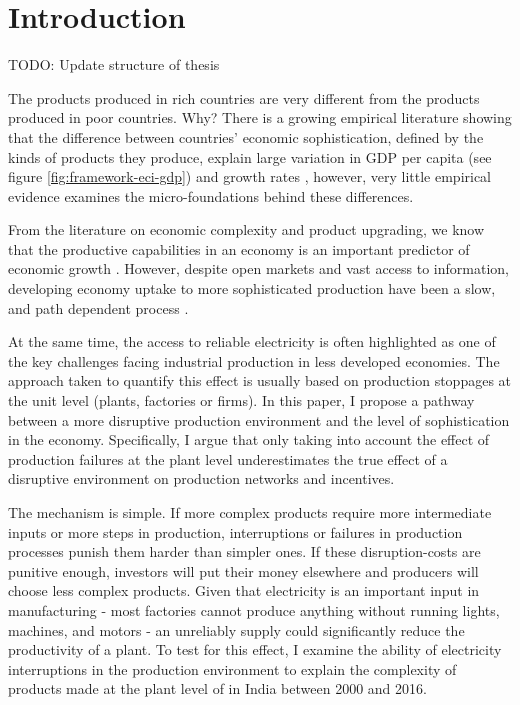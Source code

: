\documentclass[11pt]{article}
\begin{document}


% 



\newpage


\section{Introduction}\label{sec:introduction}

TODO: Update structure of thesis

The products produced in rich countries are very different from the products produced in poor countries. Why? There is a growing empirical literature showing that the difference between countries' economic sophistication, defined by the kinds of products they produce, explain large variation in GDP per capita (see figure \ref{fig:framework-eci-gdp}) and growth rates \citep{tacchella_dynamical_2018}, however, very little empirical evidence examines the micro-foundations behind these differences.

From the literature on economic complexity and product upgrading, we know that the productive capabilities in an economy is an important predictor of economic growth \citep{hausmann_network_2011}. However, despite open markets and vast access to information, developing economy uptake to more sophisticated production have been a slow, and path dependent process \citep{hidalgo_product_2007}.

At the same time, the access to reliable electricity is often highlighted as one of the key challenges facing industrial production in less developed economies. The approach taken to quantify this effect is usually based on production stoppages at the unit level (plants, factories or firms). In this paper, I propose a pathway between a more disruptive production environment and the level of sophistication in the economy. Specifically, I argue that only taking into account the effect of production failures at the plant level underestimates the true effect of a disruptive environment on production networks and incentives.

The mechanism is simple. If more complex products require more intermediate inputs or more steps in production, interruptions or failures in production processes punish them harder than simpler ones. If these disruption-costs are punitive enough, investors will put their money elsewhere and producers will choose less complex products. Given that electricity is an important input in manufacturing -  most factories cannot produce anything without running lights, machines, and motors - an unreliably supply could significantly reduce the productivity of a plant. To test for this effect, I examine the ability of electricity interruptions in the production environment to explain the complexity of products made at the plant level of in India between 2000 and 2016. 
\end{document}
